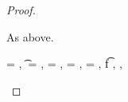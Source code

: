 \begin{lemma}
\begin{proof}
\begin{case}[T-DefMethod]
\begin{itemize}
\begin{subcase}[BE-DefMethod3]
                As above.

      \end{subcase}
  \end{itemize}
\end{case}

\begin{case}[T-App]
  \e{} = { {}},
  \t{} = {
                      {}
                      {\x{}}},
  {\thenprop {\prop{}}} = 
                 {
                              {}
                              {\x{}}},
  {\elseprop {\prop{}}} = 
                 {
                              {}
                              {\x{}}},
  \object{} = {
                           {}
                           {\x{}}},
  \judgement {\propenv{}} { {\ArrowOne {\x{}} {\s{}}
                                                       {\t{f}}
                                                       {
                                                                   {}}
                                                       {}}}
                {
                            {}}
                {},
  \judgement {\propenv{}}
                 { {\s{}}}
                 {
                             {}}
                 {},
  \opsem{\openv{}}{\e{}}{\v{}}

\end{case}
\end{proof}
\end{lemma}
